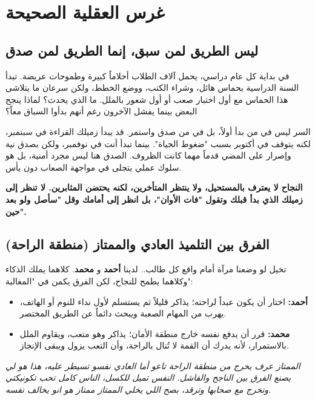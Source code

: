\documentclass[12pt,a4paper]{book}
\newcommand{\quoteAr}[1]{%
	\begin{myquote}
		\itshape #1
	\end{myquote}
}
\newcommand{\importantAr}[1]{%
	\begin{important}
		\bfseries #1
	\end{important}
}
\begin{document}
	\chapter{غرس العقلية الصحيحة}
	\label{chap:mindset}
	
	\section{ليس الطريق لمن سبق، إنما الطريق لمن صدق}
	
	في بداية كل عام دراسي، يحمل آلاف الطلاب أحلاماً كبيرة وطموحات عريضة. تبدأ السنة الدراسية بحماس هائل، وشراء الكتب، ووضع الخطط، ولكن سرعان ما يتلاشى هذا الحماس مع أول اختبار صعب أو أول شعور بالملل. ما الذي يحدث؟ لماذا ينجح البعض بينما يفشل الآخرون رغم أنهم بدأوا السباق معاً؟
	
	السر ليس في من بدأ أولاً، بل في من صدق واستمر. قد يبدأ زميلك القراءة في سبتمبر، لكنه يتوقف في أكتوبر بسبب "ضغوط الحياة". بينما تبدأ أنت في نوفمبر، ولكن بصدق نية وإصرار على المضي قدماً مهما كانت الظروف. الصدق هنا ليس مجرد أمنية، بل هو سلوك عملي يتجلى في مواجهة الصعاب دون يأس.
	
	
	\importantAr{النجاح لا يعترف بالمستحيل، ولا ينتظر المتأخرين، لكنه يحتضن المثابرين. لا تنظر إلى زميلك الذي بدأ قبلك وتقول "فات الأوان"، بل انظر إلى أمامك وقل "سأصل ولو بعد حين".}
	
	\section{الفرق بين التلميذ العادي والممتاز (منطقة الراحة)}
	\label{sec:owner-experiences}
	
	
	تخيل لو وضعنا مرآة أمام واقع كل طالب.. لدينا \textbf{أحمد} و\textbf{ محمد}. كلاهما يملك الذكاء وكلاهما يطمح للنجاح، لكن الفرق يكمن في "المغالبة":
	
	\begin{itemize}
		\item \textbf{أحمد:} اختار أن يكون عبداً لراحته؛ يذاكر قليلاً ثم يستسلم لأول نداء للنوم أو الهاتف، يهرب من المهام الصعبة ويبحث دائماً عن الطريق المختصر.
		\item \textbf{محمد:} قرر أن يدفع نفسه خارج منطقة الأمان؛ يذاكر وهو متعب، ويقاوم الملل بالاستمرار، لأنه يدرك أن القمة لا تُنال بالراحة، وأن التعب يزول ويبقى الإنجاز.
	\end{itemize}

		\quoteAr{الممتاز عرف يخرج من منطقة الراحة تاعو أما العادي نفسو تسيطر عليه، هذا هو لي يصنع الفرق بين الناجح والفاشل. النفس تميل للكسل، الناس كامل تحب تكونيكتي وتخرج مع صحابها وترقد، بصح اللي يخلي الممتاز ممتاز هو انو يخالف نفسه.}
\end{document}
